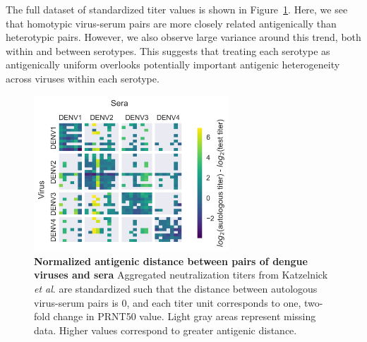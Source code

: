 The full dataset of standardized titer values is shown in Figure~\ref{titer_heatmap}.
Here, we see that homotypic virus-serum pairs are more closely related antigenically than heterotypic pairs.
However, we also observe large variance around this trend, both within and between serotypes.
This suggests that treating each serotype as antigenically uniform overlooks potentially important antigenic heterogeneity across viruses within each serotype.

\begin{figure}[ht!]
\begin{centering}
\includegraphics[width=0.65\textwidth]{./png/titer_heatmap.png}
    \caption[Normalized antigenic distance between pairs of dengue viruses and sera]{\textbf{Normalized antigenic distance between pairs of dengue viruses and sera }
    Aggregated neutralization titers from Katzelnick \textit{et al}. are standardized such that the distance between autologous virus-serum pairs is 0, and each titer unit corresponds to one, two-fold change in PRNT50 value.
    Light gray areas represent missing data.
    Higher values correspond to greater antigenic distance.
    }
     \label{titer_heatmap}
\end{centering}
\end{figure}

